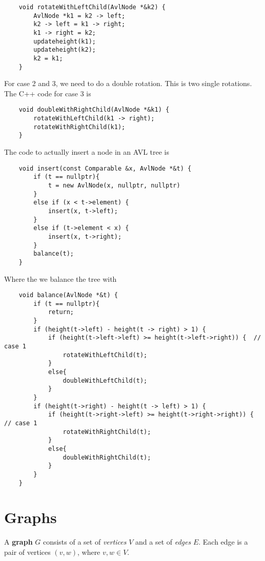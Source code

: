 \documentclass[]{article}
\begin{document}
\begin{lstlisting}
	void rotateWithLeftChild(AvlNode *&k2) {
		AvlNode *k1 = k2 -> left;
		k2 -> left = k1 -> right;
		k1 -> right = k2;
		updateheight(k1);
		updateheight(k2);
		k2 = k1;
	}
\end{lstlisting}\bigbreak

For case 2 and 3, we need to do a double rotation. This is two single rotations. The C++ code for case 3 is\\

\begin{lstlisting}
	void doubleWithRightChild(AvlNode *&k1) {
		rotateWithLeftChild(k1 -> right);
		rotateWithRightChild(k1);
	}
\end{lstlisting}\bigbreak

The code to actually insert a node in an AVL tree is

\begin{lstlisting}
	void insert(const Comparable &x, AvlNode *&t) {
		if (t == nullptr){
			t = new AvlNode(x, nullptr, nullptr)
		} 
		else if (x < t->element) {
			insert(x, t->left);
		}
		else if (t->element < x) {
			insert(x, t->right);	
		}
		balance(t);
	}
\end{lstlisting}\bigbreak

Where the we balance the tree with

\begin{lstlisting}
	void balance(AvlNode *&t) {
		if (t == nullptr){
			return;
		}
		if (height(t->left) - height(t -> right) > 1) {
			if (height(t->left->left) >= height(t->left->right)) {  // case 1
				rotateWithLeftChild(t);
			}
			else{
				doubleWithLeftChild(t);
			}
		}
		if (height(t->right) - height(t -> left) > 1) {
			if (height(t->right->left) >= height(t->right->right)) {  // case 1
				rotateWithRightChild(t);
			}
			else{
				doubleWithRightChild(t);
			}
		} 
	}
\end{lstlisting}\bigbreak




\section{Graphs}\bigbreak\bigbreak

A \textbf{graph} $G$ consists of a set of \textit{vertices} $V$ and a set of \textit{edges} $E$. Each edge is a pair of vertices $(v, w)$, where $v, w \in V$.\\

\end{document}
